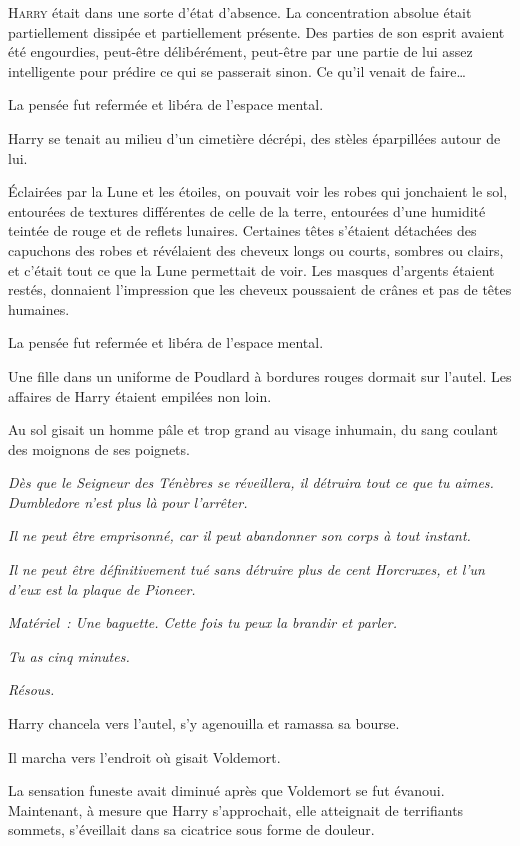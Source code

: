 
\lettrine{H}{arry} était dans une sorte d'état d'absence. La concentration absolue était partiellement dissipée et partiellement présente. Des parties de son esprit avaient été engourdies, peut-être délibérément, peut-être par une partie de lui assez intelligente pour prédire ce qui se passerait sinon. Ce qu'il venait de faire…

La pensée fut refermée et libéra de l'espace mental.

Harry se tenait au milieu d'un cimetière décrépi, des stèles éparpillées autour de lui.

Éclairées par la Lune et les étoiles, on pouvait voir les robes qui jonchaient le sol, entourées de textures différentes de celle de la terre, entourées d'une humidité teintée de rouge et de reflets lunaires. Certaines têtes s'étaient détachées des capuchons des robes et révélaient des cheveux longs ou courts, sombres ou clairs, et c'était tout ce que la Lune permettait de voir. Les masques d'argents étaient restés, donnaient l'impression que les cheveux poussaient de crânes et pas de têtes humaines.

La pensée fut refermée et libéra de l'espace mental.

Une fille dans un uniforme de Poudlard à bordures rouges dormait sur l'autel. Les affaires de Harry étaient empilées non loin.

Au sol gisait un homme pâle et trop grand au visage inhumain, du sang coulant des moignons de ses poignets.

\emph{Dès que le Seigneur des Ténèbres se réveillera, il détruira tout ce que tu aimes. Dumbledore n'est plus là pour l'arrêter.}

\emph{Il ne peut être emprisonné, car il peut abandonner son corps à tout instant.}

\emph{Il ne peut être définitivement tué sans détruire plus de cent Horcruxes, et l'un d'eux est la plaque de Pioneer.}

\emph{Matériel~: Une baguette. Cette fois tu peux la brandir et parler.}

\emph{Tu as cinq minutes.}

\emph{Résous.}

Harry chancela vers l'autel, s'y agenouilla et ramassa sa bourse.

Il marcha vers l'endroit où gisait Voldemort.

La sensation funeste avait diminué après que Voldemort se fut évanoui. Maintenant, à mesure que Harry s'approchait, elle atteignait de terrifiants sommets, s'éveillait dans sa cicatrice sous forme de douleur.

